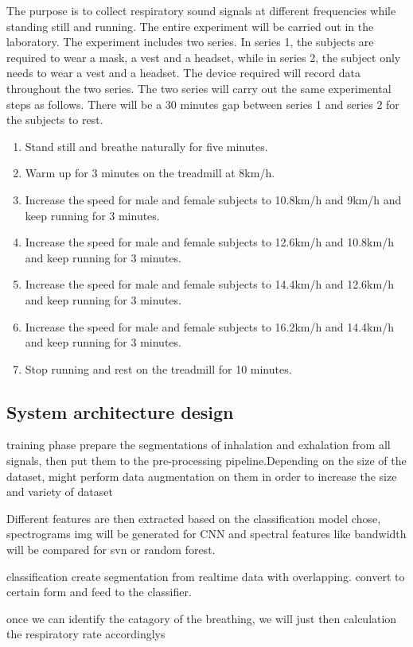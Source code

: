 The purpose is to collect respiratory sound signals at different frequencies while standing still and running. The entire experiment will be carried out in the laboratory. The experiment includes two series.  In series 1, the subjects are required to wear a mask, a vest and a headset, while in series 2, the subject only needs to wear a vest and a headset. The device required will record data throughout the two series. The two series will carry out the same experimental steps as follows. There will be a 30 minutes gap between series 1 and series 2 for the subjects to rest.
\begin{enumerate}
\item Stand still and breathe naturally for five minutes.
\item Warm up for 3 minutes on the treadmill at 8km/h.
\item Increase the speed for male and female subjects to 10.8km/h and 9km/h and keep running for 3 minutes.
\item Increase the speed for male and female subjects to 12.6km/h and 10.8km/h and keep running for 3 minutes.
\item Increase the speed for male and female subjects to 14.4km/h and 12.6km/h and keep running for 3 minutes.
\item Increase the speed for male and female subjects to 16.2km/h and 14.4km/h and keep running for 3 minutes.
\item Stop running and rest on the treadmill for 10 minutes.
\end{enumerate}

\subsection{System architecture design}
training phase
prepare the segmentations of inhalation and exhalation from all signals, then put them to the pre-processing pipeline.Depending on the size of the dataset, might perform data augmentation on them in order to increase the size and variety of dataset

Different features are then extracted based on the classification model chose, spectrograms img will be generated for CNN and spectral features like bandwidth will be compared for svn or random forest.

classification
create segmentation from realtime data with overlapping. convert to certain form and feed to the classifier.

once we can identify the catagory of the breathing, we will just then calculation the respiratory rate accordinglys
